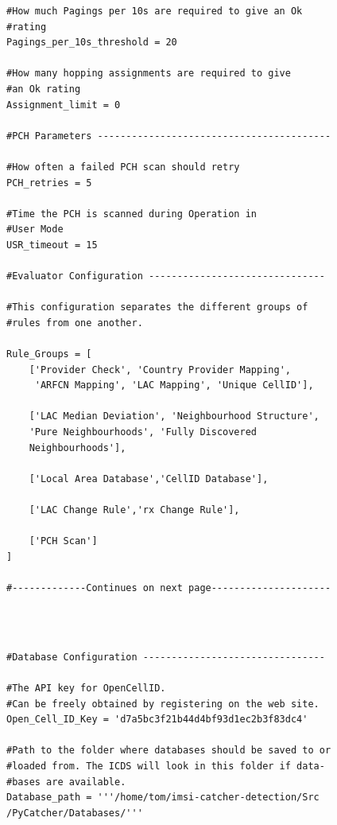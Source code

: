 \begin{minipage}{\dimexpr\textwidth-4\fboxsep-2\fboxrule} 
\begin{lstlisting}
#How much Pagings per 10s are required to give an Ok 
#rating
Pagings_per_10s_threshold = 20

#How many hopping assignments are required to give
#an Ok rating
Assignment_limit = 0

#PCH Parameters -----------------------------------------

#How often a failed PCH scan should retry
PCH_retries = 5

#Time the PCH is scanned during Operation in 
#User Mode
USR_timeout = 15

#Evaluator Configuration -------------------------------

#This configuration separates the different groups of
#rules from one another.

Rule_Groups = [
    ['Provider Check', 'Country Provider Mapping',
     'ARFCN Mapping', 'LAC Mapping', 'Unique CellID'],
    
    ['LAC Median Deviation', 'Neighbourhood Structure', 
    'Pure Neighbourhoods', 'Fully Discovered 
    Neighbourhoods'],
    
    ['Local Area Database','CellID Database'],
    
    ['LAC Change Rule','rx Change Rule'],
    
    ['PCH Scan']
]

#-------------Continues on next page---------------------
\end{lstlisting}
\end{minipage}\\\\
\hspace*{\dimexpr\fboxsep+\fboxrule}%
\begin{minipage}{\dimexpr\textwidth-4\fboxsep-2\fboxrule} 
\begin{lstlisting}
#Database Configuration --------------------------------

#The API key for OpenCellID.
#Can be freely obtained by registering on the web site. 
Open_Cell_ID_Key = 'd7a5bc3f21b44d4bf93d1ec2b3f83dc4'

#Path to the folder where databases should be saved to or
#loaded from. The ICDS will look in this folder if data-
#bases are available.
Database_path = '''/home/tom/imsi-catcher-detection/Src
/PyCatcher/Databases/'''
\end{lstlisting}
\end{minipage}


